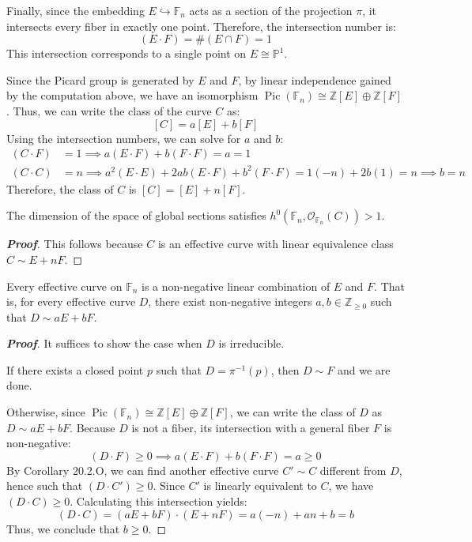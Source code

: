 Finally, since the embedding $E \hookrightarrow \mathbb{F}_n$ acts as a section of the projection $\pi$, it intersects every fiber in exactly one point. Therefore, the intersection number is:
\[
(E \cdot F) = \#(E \cap F) = 1
\]
This intersection corresponds to a single point on $E \cong \mathbb{P}^1$.

Since the Picard group is generated by $E$ and $F$,
by linear independence gained by the computation above,
we have an isomorphism $\operatorname{Pic}(\mathbb{F}_n) \cong \mathbb{Z}[E] \oplus \mathbb{Z}[F]$. Thus, we can write the class of the curve $C$ as:
\[
[C] = a[E] + b[F]
\]
Using the intersection numbers, we can solve for $a$ and $b$:
\begin{align*}
(C \cdot F) &= 1 \implies a(E \cdot F) + b(F \cdot F) = a = 1 \\
(C \cdot C) &= n \implies a^2(E \cdot E) + 2ab(E \cdot F) + b^2(F \cdot F) = 1(-n) + 2b(1) = n \implies b = n
\end{align*}
Therefore, the class of $C$ is $[C] = [E] + n[F]$.

\begin{corollary}[20.2.O]
The dimension of the space of global sections satisfies $h^0(\mathbb{F}_n, \mathcal{O}_{\mathbb{F}_n}(C)) > 1$.
\end{corollary}

\begin{proof}[\textbf{Proof}]
This follows because $C$ is an effective curve with linear equivalence class $C \sim E + nF$.
\end{proof}

\begin{proposition}[20.2.P]
Every effective curve on $\mathbb{F}_n$ is a non-negative linear combination of $E$ and $F$. That is, for every effective curve $D$, there exist non-negative integers $a, b \in \mathbb{Z}_{\ge 0}$ such that $D \sim aE + bF$.
\end{proposition}

\begin{proof}[\textbf{Proof}]
It suffices to show the case when $D$ is irreducible.

If there exists a closed point $p$ such that $D = \pi^{-1}(p)$, then $D \sim F$ and we are done.

Otherwise, since $\operatorname{Pic}(\mathbb{F}_n) \cong \mathbb{Z}[E] \oplus \mathbb{Z}[F]$, we can write the class of $D$ as $D \sim aE + bF$. Because $D$ is not a fiber, its intersection with a general fiber $F$ is non-negative:
\[
(D \cdot F) \ge 0 \implies a(E \cdot F) + b(F \cdot F) = a \ge 0
\]
By Corollary 20.2.O, we can find another effective curve $C' \sim C$ different from $D$, 
hence such that $(D \cdot C') \ge 0$. 
Since $C'$ is linearly equivalent to $C$, we have $(D \cdot C) \ge 0$. Calculating this intersection yields:
\[
(D \cdot C) = (aE + bF) \cdot (E + nF) = a(-n) + an + b = b
\]
Thus, we conclude that $b \ge 0$.
\end{proof}

